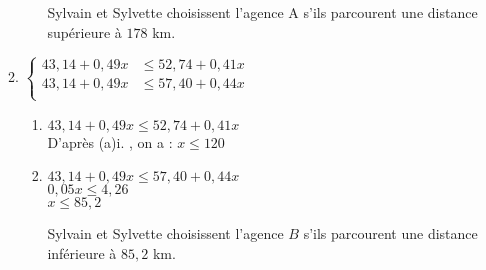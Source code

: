 \begin{enumerate}
\begin{enumerate}
\begin{enumerate}

Sylvain et Sylvette choisissent l'agence A s'ils parcourent une distance supérieure à $178$ km. \\
\end{enumerate}
\newpage

\item  $\begin{cases}
43,14+0,49x &\leqslant 52,74+0,41x\\
43,14+0,49x & \leqslant 57,40+0,44x\\
\end{cases}$  \\

\begin{enumerate}
\item $43,14+0,49x \leqslant 52,74+0,41x$ \\

       D'après (a)i. , on a : $x\leqslant 120$ \\

\item $43,14+0,49x \leqslant 57,40+0,44x$\\

$0,05x \leqslant 4,26 $\\

$x \leqslant 85,2 $ \\




Sylvain et Sylvette choisissent l'agence $B$ s'ils parcourent une distance inférieure à $85,2$ km. 
\end{enumerate}


\end{enumerate}
\end{enumerate}
